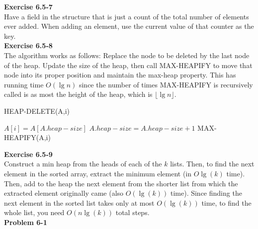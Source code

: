 \documentclass{article}
\begin{document}
\noindent\textbf{Exercise 6.5-7}\\

Have a field in the structure that is just a count of the total number of elements ever added. When adding an element, use the current value of that counter as the key.\\

\noindent\textbf{Exercise 6.5-8}\\

The algorithm works as follows:  Replace the node to be deleted by the last node of the heap.  Update the size of the heap, then call MAX-HEAPIFY to move that node into its proper position and maintain the max-heap property.  This has running time $O(\lg n)$ since the number of times MAX-HEAPIFY is recursively called is as most the height of the heap, which is $\lfloor \lg n \rfloor$.

\begin{algorithm}
\caption{HEAP-DELETE(A,i)}
\begin{algorithmic}[1]
\State $A[i] = A[A.heap-size]$ 
\State $A.heap-size = A.heap-size + 1$
\State MAX-HEAPIFY(A,i)
\end{algorithmic}
\end{algorithm}

\noindent\textbf{Exercise 6.5-9}\\

Construct a min heap from the heads of each of the $k$ lists. Then, to find the next element in the sorted array, extract the minimum element (in $O\lg(k)$ time). Then, add to the heap the next element from the shorter list from which the extracted element originally came (also $O(\lg(k))$ time). Since finding the next element in the sorted list takes only at most $O(\lg(k))$ time, to find the whole list, you need $O(n\lg(k))$ total steps. \\



\noindent\textbf{Problem 6-1}\\
\end{document}
